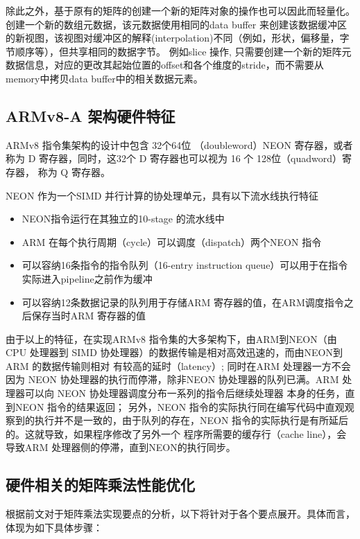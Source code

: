 除此之外，基于原有的矩阵的创建一个新的矩阵对象的操作也可以因此而轻量化。创建一个新的数组元数据，该元数据使用相同的data
buffer 来创建该数据缓冲区的新视图，该视图对缓冲区的解释(interpolation)不同（例如，形状，偏移量，字节顺序等），但共享相同的数据字节。 例如slice 操作,
只需要创建一个新的矩阵元数据信息，对应的更改其起始位置的offset和各个维度的stride，而不需要从memory中拷贝data buffer中的相关数据元素。

\subsection{ARMv8-A 架构硬件特征}
\label{sec:hwchar}

ARMv8 指令集架构的设计中包含 32个64位 （doubleword）NEON 寄存器，或者称为 D 寄存器，同时，这32个 D 寄存器也可以视为 16 个 128位（quadword）寄存器，
称为 Q 寄存器。

NEON 作为一个SIMD 并行计算的协处理单元，具有以下流水线执行特征
\begin{itemize}
\item NEON指令运行在其独立的10-stage 的流水线中
\item ARM 在每个执行周期（cycle）可以调度（dispatch）两个NEON 指令
\item 可以容纳16条指令的指令队列（16-entry instruction queue）可以用于在指令实际进入pipeline之前作为缓冲
\item 可以容纳12条数据记录的队列用于存储ARM 寄存器的值，在ARM调度指令之后保存当时ARM 寄存器的值
\end{itemize}

由于以上的特征，在实现ARMv8 指令集的大多架构下，由ARM到NEON（由CPU 处理器到 SIMD 协处理器）的数据传输是相对高效迅速的，而由NEON到ARM 的数据传输则相对
有较高的延时（latency）;
同时在ARM 处理器一方不会因为 NEON 协处理器的执行而停滞，除非NEON 协处理器的队列已满。ARM 处理器可以向 NEON 协处理器调度分布一系列的指令后继续处理器
本身的任务，直到NEON 指令的结果返回；
另外，NEON 指令的实际执行同在编写代码中直观观察到的执行并不是一致的，由于队列的存在，NEON 指令的实际执行是有所延后的。这就导致，如果程序修改了另外一个
程序所需要的缓存行（cache line），会导致ARM 处理器侧的停滞，直到NEON的执行同步。

\subsection{硬件相关的矩阵乘法性能优化}
\label{sec:matrix-mul}

根据前文对于矩阵乘法实现要点的分析，以下将针对于各个要点展开。具体而言，体现为如下具体步骤：

